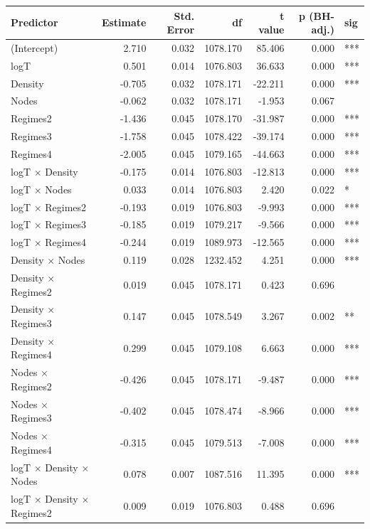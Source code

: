 \begin{table}[ht]
\centering
\begin{tabular}{lrrrrrl}
  \hline
Predictor & Estimate & Std. Error & df & t value & p (BH-adj.) & sig \\ 
  \hline
(Intercept) & 2.710 & 0.032 & 1078.170 & 85.406 & 0.000 & *** \\ 
  logT & 0.501 & 0.014 & 1076.803 & 36.633 & 0.000 & *** \\ 
  Density & -0.705 & 0.032 & 1078.171 & -22.211 & 0.000 & *** \\ 
  Nodes & -0.062 & 0.032 & 1078.171 & -1.953 & 0.067 &  \\ 
  Regimes2 & -1.436 & 0.045 & 1078.170 & -31.987 & 0.000 & *** \\ 
  Regimes3 & -1.758 & 0.045 & 1078.422 & -39.174 & 0.000 & *** \\ 
  Regimes4 & -2.005 & 0.045 & 1079.165 & -44.663 & 0.000 & *** \\ 
  logT × Density & -0.175 & 0.014 & 1076.803 & -12.813 & 0.000 & *** \\ 
  logT × Nodes & 0.033 & 0.014 & 1076.803 & 2.420 & 0.022 & * \\ 
  logT × Regimes2 & -0.193 & 0.019 & 1076.803 & -9.993 & 0.000 & *** \\ 
  logT × Regimes3 & -0.185 & 0.019 & 1079.217 & -9.566 & 0.000 & *** \\ 
  logT × Regimes4 & -0.244 & 0.019 & 1089.973 & -12.565 & 0.000 & *** \\ 
  Density × Nodes & 0.119 & 0.028 & 1232.452 & 4.251 & 0.000 & *** \\ 
  Density × Regimes2 & 0.019 & 0.045 & 1078.171 & 0.423 & 0.696 &  \\ 
  Density × Regimes3 & 0.147 & 0.045 & 1078.549 & 3.267 & 0.002 & ** \\ 
  Density × Regimes4 & 0.299 & 0.045 & 1079.108 & 6.663 & 0.000 & *** \\ 
  Nodes × Regimes2 & -0.426 & 0.045 & 1078.171 & -9.487 & 0.000 & *** \\ 
  Nodes × Regimes3 & -0.402 & 0.045 & 1078.474 & -8.966 & 0.000 & *** \\ 
  Nodes × Regimes4 & -0.315 & 0.045 & 1079.513 & -7.008 & 0.000 & *** \\ 
  logT × Density × Nodes & 0.078 & 0.007 & 1087.516 & 11.395 & 0.000 & *** \\ 
  logT × Density × Regimes2 & 0.009 & 0.019 & 1076.803 & 0.488 & 0.696 &  \\ 

\end{tabular}
\end{table}
